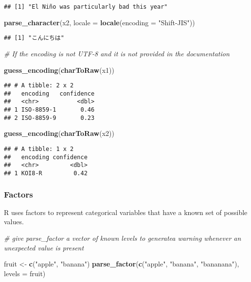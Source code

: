 \documentclass[]{article}
\newenvironment{Shaded}{\begin{snugshade}}{\end{snugshade}}
\newcommand{\KeywordTok}[1]{\textcolor[rgb]{0.13,0.29,0.53}{\textbf{#1}}}
\newcommand{\DataTypeTok}[1]{\textcolor[rgb]{0.13,0.29,0.53}{#1}}
\newcommand{\StringTok}[1]{\textcolor[rgb]{0.31,0.60,0.02}{#1}}
\newcommand{\CommentTok}[1]{\textcolor[rgb]{0.56,0.35,0.01}{\textit{#1}}}
\newcommand{\NormalTok}[1]{#1}
\begin{document}
\begin{verbatim}
## [1] "El Niño was particularly bad this year"
\end{verbatim}

\begin{Shaded}
\begin{Highlighting}[]
\KeywordTok{parse_character}\NormalTok{(x2, }\DataTypeTok{locale =} \KeywordTok{locale}\NormalTok{(}\DataTypeTok{encoding =} \StringTok{"Shift-JIS"}\NormalTok{))}
\end{Highlighting}
\end{Shaded}

\begin{verbatim}
## [1] "こんにちは"
\end{verbatim}

\begin{Shaded}
\begin{Highlighting}[]
\CommentTok{# If the encoding is not UTF-8 and it is not provided in the documentation}

\KeywordTok{guess_encoding}\NormalTok{(}\KeywordTok{charToRaw}\NormalTok{(x1))}
\end{Highlighting}
\end{Shaded}

\begin{verbatim}
## # A tibble: 2 x 2
##   encoding   confidence
##   <chr>           <dbl>
## 1 ISO-8859-1       0.46
## 2 ISO-8859-9       0.23
\end{verbatim}

\begin{Shaded}
\begin{Highlighting}[]
\KeywordTok{guess_encoding}\NormalTok{(}\KeywordTok{charToRaw}\NormalTok{(x2))}
\end{Highlighting}
\end{Shaded}

\begin{verbatim}
## # A tibble: 1 x 2
##   encoding confidence
##   <chr>         <dbl>
## 1 KOI8-R         0.42
\end{verbatim}

\subsubsection{Factors}\label{factors}

R uses factors to represent categorical variables that have a known set
of possible values.

\begin{Shaded}
\begin{Highlighting}[]
\CommentTok{# give parse_factor a vector of known levels to generatea warning whenever an unexpected value is present }

\NormalTok{fruit <-}\StringTok{ }\KeywordTok{c}\NormalTok{(}\StringTok{"apple"}\NormalTok{, }\StringTok{"banana"}\NormalTok{)}
\KeywordTok{parse_factor}\NormalTok{(}\KeywordTok{c}\NormalTok{(}\StringTok{"apple"}\NormalTok{, }\StringTok{"banana"}\NormalTok{, }\StringTok{"bananana"}\NormalTok{), }\DataTypeTok{levels =}\NormalTok{ fruit)}
\end{Highlighting}
\end{Shaded}
\end{document}
